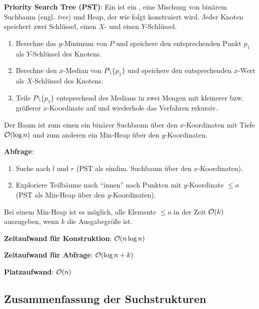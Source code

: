 \textbf{Priority Search Tree (PST)}:
Ein  ist ein , eine Mischung von
binärem Suchbaum (engl. \emph{tree}) und Heap, der wie folgt konstruiert wird.
Jeder Knoten speichert zwei Schlüssel, einen $X$- und einen $Y$-Schlüssel.
\begin{enumerate}
    \item
    Berechne das $y$-Minimum von $P$ und
    speichere den entsprechenden Punkt $p_1$ als $Y$-Schlüssel des Knotens.
    
    \item
    Berechne den $x$-Median von $P \setminus \{p_1\}$ und
    speichere den entsprechenden $x$-Wert als $X$-Schlüssel des Knotens.
    
    \item
    Teile $P \setminus \{p_1\}$ entsprechend des Medians in zwei Mengen mit kleinerer bzw.
    größerer $x$-Koordinate auf und wiederhole das Verfahren rekursiv.
\end{enumerate}

Der Baum ist zum einen ein binärer Suchbaum über den $x$-Koordinaten mit Tiefe $\mathcal{O}(\log n)$
und zum anderen ein Min-Heap über den $y$-Koordinaten.

\linie

\textbf{Abfrage}:
\begin{enumerate}
    \item
    Suche nach $l$ und $r$ (PST als eindim. Suchbaum über den $x$-Koordinaten).
    
    \item
    Exploriere Teilbäume nach "`innen"' nach Punkten mit $y$-Koordinate $\le o$\\
    (PST als Min-Heap über den $y$-Koordinaten).
\end{enumerate}

Bei einem Min-Heap ist es möglich, alle Elemente $\le o$ in der Zeit $\mathcal{O}(k)$ auszugeben,
wenn $k$ die Ausgabegröße ist.

\linie

\textbf{Zeitaufwand für Konstruktion}:
$\mathcal{O}(n \log n)$

\textbf{Zeitaufwand für Abfrage}:
$\mathcal{O}(\log n + k)$

\textbf{Platzaufwand}:
$\mathcal{O}(n)$

\subsection{%
    Zusammenfassung der Suchstrukturen%
}

